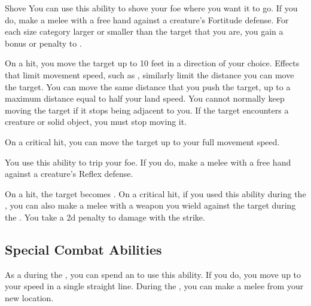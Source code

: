             \begin{ability}{Shove}\label{Shove}
                You can use this ability to shove your foe where you want it to go.
                If you do, make a melee  with a free hand against a creature's Fortitude defense.
                For each size category larger or smaller than the target that you are, you gain a  bonus or penalty to .

                On a hit, you move the target up to 10 feet in a direction of your choice.
                Effects that limit movement speed, such as , similarly limit the distance you can move the target.
                You can move the same distance that you push the target, up to a maximum distance equal to half your land speed.
                You cannot normally keep moving the target if it stops being adjacent to you.
                If the target encounters a creature or solid object, you must stop moving it.

                On a critical hit, you can move the target up to your full movement speed.
            \end{ability}

            \begin{ability}{}
                You use this ability to trip your foe.
                If you do, make a melee  with a free hand against a creature's Reflex defense.

                On a hit, the target becomes \prone.
                On a critical hit, if you used this ability during the , you can also make a melee  with a weapon you wield against the target during the .
                You take a \minus2d penalty to damage with the strike.
            \end{ability}

    \subsection{Special Combat Abilities}

        \begin{ability}{}
            As a  during the , you can spend an  to use this ability.
            If you do, you move up to your speed in a single straight line.
            During the , you can make a melee  from your new location.
        \end{ability}

